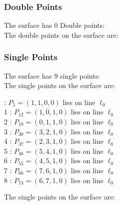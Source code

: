 \documentclass{article}
\begin{document}
{\subsubsection*{Double Points}
The surface has 0 Double points:\\
The double points on the surface are:\\
\begin{multicols}{2}
\noindent
\end{multicols}
\subsubsection*{Single Points}
The surface has 9 single points:\\
The single points on the surface are:\\
\begin{multicols}{2}
 : $P_{5}=( 1, 1, 0, 0 )$ lies on line $\ell_{0}$\\
1 : $P_{12}=( 1, 0, 1, 0 )$ lies on line $\ell_{0}$\\
2 : $P_{19}=( 0, 1, 1, 0 )$ lies on line $\ell_{0}$\\
3 : $P_{30}=( 3, 2, 1, 0 )$ lies on line $\ell_{0}$\\
4 : $P_{37}=( 2, 3, 1, 0 )$ lies on line $\ell_{0}$\\
5 : $P_{48}=( 5, 4, 1, 0 )$ lies on line $\ell_{0}$\\
6 : $P_{55}=( 4, 5, 1, 0 )$ lies on line $\ell_{0}$\\
7 : $P_{66}=( 7, 6, 1, 0 )$ lies on line $\ell_{0}$\\
8 : $P_{73}=( 6, 7, 1, 0 )$ lies on line $\ell_{0}$\\
\end{multicols}
The single points on the surface are:\\
}
\end{document}

